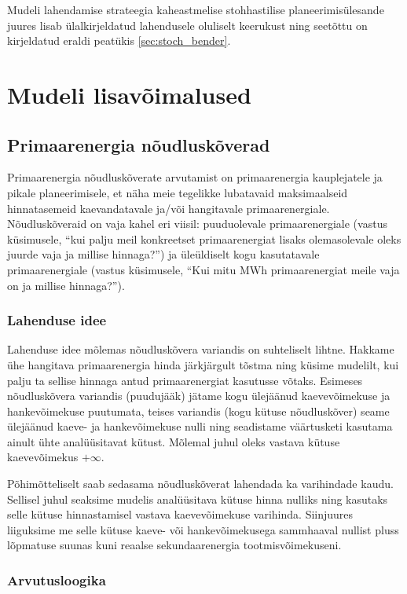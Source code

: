 \documentclass[10pt,a4paper]{article}
\begin{document}
Mudeli lahendamise strateegia kaheastmelise stohhastilise planeerimisülesande juures lisab ülalkirjeldatud lahendusele oluliselt keerukust ning seetõttu on kirjeldatud eraldi peatükis \ref{sec:stoch_bender}.

\section{Mudeli lisavõimalused}
\label{sec:lisad}
\subsection{Primaarenergia nõudluskõverad}
Primaarenergia nõudluskõverate arvutamist on primaarenergia kauplejatele ja pikale planeerimisele, et näha meie tegelikke lubatavaid maksimaalseid hinnatasemeid kaevandatavale ja/või hangitavale primaarenergiale. Nõudluskõveraid on vaja kahel eri viisil: puuduolevale primaarenergiale (vastus küsimusele, ``kui palju meil konkreetset primaarenergiat lisaks olemasolevale oleks juurde vaja ja millise hinnaga?'') ja üleüldiselt kogu kasutatavale primaarenergiale (vastus küsimusele, ``Kui mitu MWh primaarenergiat meile vaja on ja millise hinnaga?'').
\subsubsection{Lahenduse idee}
Lahenduse idee mõlemas nõudluskõvera variandis on suhteliselt lihtne. Hakkame ühe hangitava primaarenergia hinda järkjärgult tõstma ning küsime mudelilt, kui palju ta sellise hinnaga antud primaarenergiat kasutusse võtaks. Esimeses nõudluskõvera variandis (puudujääk) jätame kogu ülejäänud kaevevõimekuse ja hankevõimekuse puutumata, teises variandis (kogu kütuse nõudluskõver) seame ülejäänud kaeve- ja hankevõimekuse nulli ning seadistame väärtusketi kasutama ainult ühte analüüsitavat kütust. Mõlemal juhul oleks vastava kütuse kaevevõimekus $+\infty$.

Põhimõtteliselt saab sedasama nõudluskõverat lahendada ka varihindade kaudu. Sellisel juhul seaksime mudelis analüüsitava kütuse hinna nulliks ning kasutaks selle kütuse hinnastamisel vastava kaevevõimekuse varihinda. Siinjuures liiguksime me selle kütuse kaeve- või hankevõimekusega sammhaaval nullist pluss lõpmatuse suunas kuni reaalse sekundaarenergia tootmisvõimekuseni.
\subsubsection{Arvutusloogika}
\end{document}
